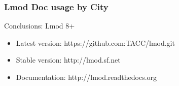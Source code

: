 \documentclass{beamer}
\begin{document}
\begin{frame}[fragile]
    \frametitle{Lmod Doc usage by City}
\end{frame}

\begin{frame}{Conclusions: Lmod 8+}
  \begin{itemize}
    \item Latest version: https://github.com:TACC/lmod.git
    \item Stable version: http://lmod.sf.net
    \item Documentation:  http://lmod.readthedocs.org
  \end{itemize}
\end{frame}
\end{document}
